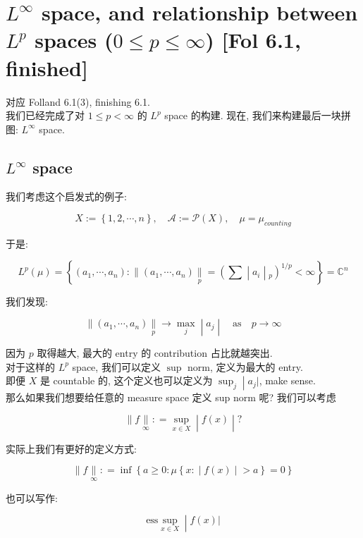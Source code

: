 \section{\texorpdfstring{\(L^{\infty}\) space, and relationship between \(L^{p}\) spaces (\(0 \leq p \leq \infty\)) {[}Fol 6.1, finished{]}}{L\^{}\{\textbackslash infty\} space, and relationship between L\^{}\{p\} spaces (0 \textbackslash leq p \textbackslash leq \textbackslash infty) {[}Fol 6.1, finished{]}}}

对应 Folland 6.1(3), finishing 6.1.\\
我们已经完成了对 \(1 \leq p < \infty\) 的 \(L^{p}\) space 的构建. 现在, 我们来构建最后一块拼图: \(L^{\infty}\) space.

\subsection{\texorpdfstring{\(L^{\infty}\) space}{L\^{}\{\textbackslash infty\} space}}\label{linfty-space}

我们考虑这个启发式的例子:

\[X := \left\{ {1,2,\cdots,n} \right\},\quad\mathcal{A} := \mathcal{P}(X),\quad\mu = \mu_{counting}\]

于是:

\[L^{p}(\mu) = \left\{ (a_{1},\cdots,a_{n}): \parallel (a_{1},\cdots,a_{n})\underset{p}{\parallel} = (\sum \middle| a_{i} \middle| {}_{p})^{1/p} < \infty \right\} = \mathbb{C}^{n}\]

我们发现:

\[\left. \parallel (a_{1},\cdots,a_{n})\underset{p}{\parallel}\rightarrow\max\limits_{j} \middle| a_{j} \middle| \quad\text{as}\quad p\rightarrow\infty \right.\]

因为 \(p\) 取得越大, 最大的 entry 的 contribution 占比就越突出.\\
对于这样的 \(L^{p}\) space, 我们可以定义 \(\sup\) norm, 定义为最大的 entry.\\
即便 \(X\) 是 countable 的, 这个定义也可以定义为 \(\left. \sup_{j} \middle| a_{j}| \right.\), make sense.\\
那么如果我们想要给任意的 measure space 定义 sup norm 呢? 我们可以考虑

\[\left. \parallel f\underset{\infty}{\parallel}: = \sup\limits_{x \in X} \middle| f(x) \middle| ? \right.\]

实际上我们有更好的定义方式:

\begin{definition}{}

\[\parallel f\underset{\infty}{\parallel}: = \inf\left\{ {a \geq 0:\mu\left\{ x: \middle| f(x) \middle| > a \right\} = 0} \right\}\]

也可以写作:

\[\left. \text{ess}\sup\limits_{x \in X} \middle| f(x)| \right.\]

\end{definition}

